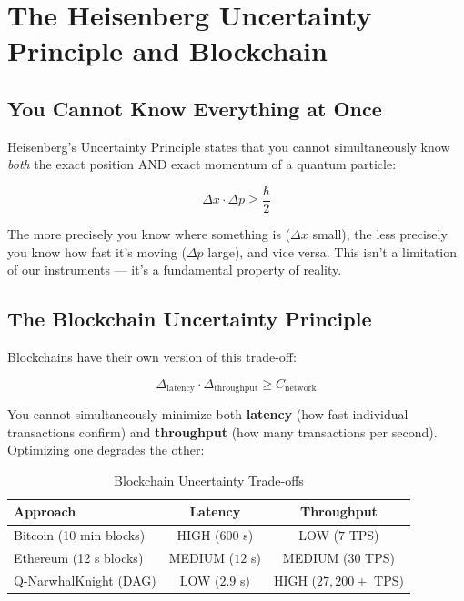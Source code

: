 \documentclass[11pt,a4paper]{article}
\begin{document}
\section{The Heisenberg Uncertainty Principle and Blockchain}

\subsection{You Cannot Know Everything at Once}

Heisenberg's Uncertainty Principle states that you cannot simultaneously know \textit{both} the exact position AND exact momentum of a quantum particle:

\begin{equation}
\Delta x \cdot \Delta p \geq \frac{\hbar}{2}
\end{equation}

The more precisely you know where something is ($\Delta x$ small), the less precisely you know how fast it's moving ($\Delta p$ large), and vice versa. This isn't a limitation of our instruments --- it's a fundamental property of reality.

\subsection{The Blockchain Uncertainty Principle}

Blockchains have their own version of this trade-off:

\begin{equation}
\Delta_{\text{latency}} \cdot \Delta_{\text{throughput}} \geq C_{\text{network}}
\end{equation}

You cannot simultaneously minimize both \textbf{latency} (how fast individual transactions confirm) and \textbf{throughput} (how many transactions per second). Optimizing one degrades the other:

\begin{table}[H]
\centering
\caption{Blockchain Uncertainty Trade-offs}
\begin{tabular}{@{}lcc@{}}
\toprule
\textbf{Approach} & \textbf{Latency} & \textbf{Throughput} \\
\midrule
Bitcoin (10 min blocks) & HIGH ($600$ s) & LOW ($7$ TPS) \\
Ethereum (12 s blocks) & MEDIUM ($12$ s) & MEDIUM ($30$ TPS) \\
Q-NarwhalKnight (DAG) & LOW ($2.9$ s) & HIGH ($27,200+$ TPS) \\
\bottomrule
\end{tabular}
\end{table}
\end{document}
